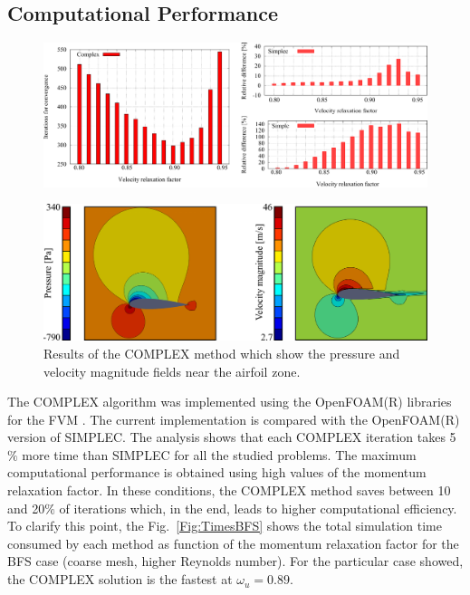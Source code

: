 \documentclass[final,3p,times,11pt,onecolumn]{myElsarticle}
\numberwithin{equation}{section}
\begin{document}
\subsection{Computational Performance}
\begin{figure}[t!]
\centering
\includegraphics[width=17cm]{fig/Turbulence/Todos.pdf}
\caption{}
\label{Fig:TTodos}
\end{figure}

\begin{figure}[t!]
\centering
\includegraphics[width=14cm]{fig/Turbulence/VelocidadPresionEscalas.pdf}
\caption{Results of the COMPLEX method which show the pressure and velocity magnitude fields near the airfoil zone.}
\label{Fig:VelocidadPresionEscalas}
\end{figure}

The COMPLEX algorithm was implemented using the OpenFOAM(R) libraries for the FVM \cite{ofpg}. The current implementation is compared with the OpenFOAM(R) version of SIMPLEC. The analysis shows that each COMPLEX iteration takes 5$\%$ more time than SIMPLEC for all the studied problems. The maximum computational performance is obtained using high values of the momentum relaxation factor. In these conditions, the COMPLEX method saves between 10 and 20$\%$ of iterations which, in the end, leads to higher computational efficiency. To clarify this point, the Fig.~\ref{Fig:TimesBFS} shows the total simulation time consumed by each method as function of the momentum relaxation factor for the BFS case (coarse mesh, higher Reynolds number). For the particular case showed, the COMPLEX solution is the fastest at $\omega_u = 0.89$.
\end{document}
